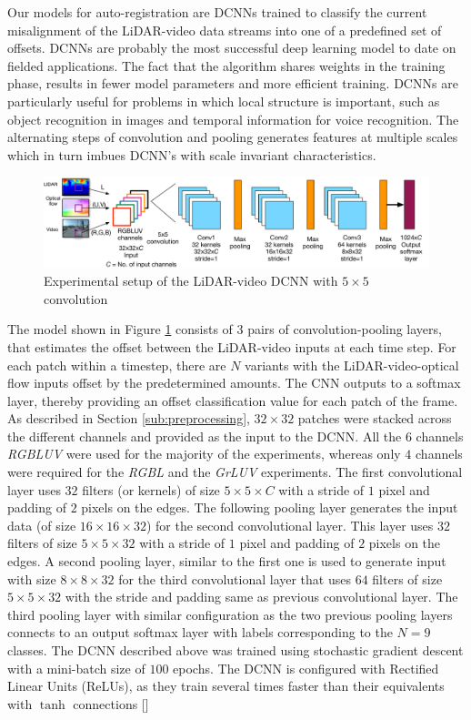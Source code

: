 \documentclass{article}
\begin{document}
Our models for auto-registration are DCNNs trained to classify the current misalignment of the LiDAR-video data streams into one of a predefined set of offsets. DCNNs are probably the most successful deep learning model to date on fielded applications. The fact that the algorithm shares weights in the training phase, results in fewer model parameters and more efficient training. DCNNs are particularly useful for problems in which local structure is important, such as object recognition in images and temporal information for voice recognition. The alternating steps of convolution and pooling generates features at multiple scales which in turn imbues DCNN's with scale invariant characteristics.

\begin{figure}[htbp]
    \centering
        \includegraphics[scale=0.42]{lidar_dcnn_setup2.pdf}
    \caption{Experimental setup of the LiDAR-video DCNN with $5\times5$ convolution}
    \label{fig:Figures_lidar_dcnn_setup1}
\end{figure}

The model shown in Figure \ref{fig:Figures_lidar_dcnn_setup1} consists of 3 pairs of convolution-pooling layers, that estimates the offset between the LiDAR-video inputs at each time step. For each patch within a timestep, there are $N$ variants with the LiDAR-video-optical flow inputs offset by the predetermined amounts. The CNN outputs to a softmax layer, thereby providing an offset classification value for each patch of the frame. As described in Section \ref{sub:preprocessing}, $32\times32$ patches were stacked across the different channels and provided as the input to the DCNN. All the $6$ channels \emph{RGBLUV} were used for the majority of the experiments, whereas only $4$ channels were required for the \emph{RGBL} and the \emph{GrLUV} experiments. The first convolutional layer uses $32$ filters (or kernels) of size $5 \times 5 \times \mathit{C} $ with a stride of $1$ pixel and padding of $2$ pixels on the edges. The following pooling layer generates the input data (of size $16 \times 16 \times 32$) for the second convolutional layer. This layer uses $32$ filters of size $5 \times 5 \times 32$ with a stride of $1$ pixel and padding of $2$ pixels on the edges. A second pooling layer, similar to the first one is used to generate input with size $8 \times 8 \times 32$ for the third convolutional layer that uses $64$ filters of size $5 \times 5 \times 32$ with the stride and padding same as previous convolutional layer. The third pooling layer with similar configuration as the two previous pooling layers connects to an output softmax layer with labels corresponding to the $N=9$ classes. The DCNN described above was trained using stochastic gradient descent with a mini-batch size of $100$ epochs. The DCNN is configured with Rectified Linear Units (ReLUs), as they train several times faster than their equivalents with $\tanh$ connections [\cite{Nair2010Rectified-}]
\end{document}
